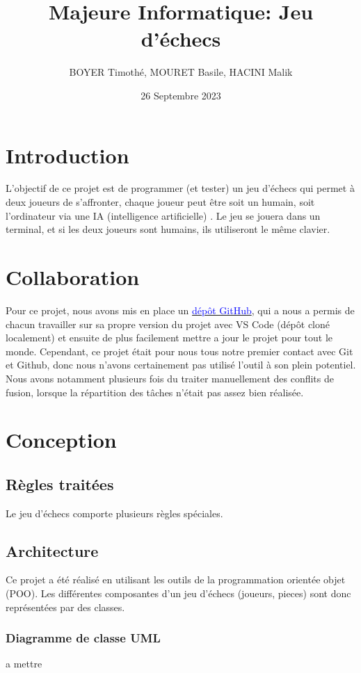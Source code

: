 \documentclass{article}
\title{\centering Majeure Informatique: 
Jeu d'échecs}
\author{BOYER Timothé, MOURET Basile, HACINI Malik}
\date{26 Septembre 2023}
\begin{document}
    
    

\maketitle
\tableofcontents{}

\section{Introduction}
L’objectif de ce projet est de programmer (et tester) un jeu
d’échecs qui permet à deux joueurs de s’affronter, 
chaque joueur peut être soit un humain, soit l’ordinateur via une IA
 (intelligence artificielle) . Le jeu se jouera dans un terminal, 
 et si les deux joueurs sont humains, ils utiliseront le même clavier.
 \section{Collaboration}
 
Pour ce projet, nous avons mis en place un \href{https://github.com/Zertag/Projet-POO}{\textcolor{blue}{dépôt GitHub}}, qui a nous a permis
de chacun travailler sur sa propre version du projet avec VS Code (dépôt cloné localement) et 
ensuite de plus facilement mettre a jour le projet pour tout le monde.
Cependant, ce projet était pour nous tous notre premier contact avec Git et Github, donc
nous n'avons certainement pas utilisé l'outil à son plein potentiel. Nous avons notamment
plusieurs fois du traiter manuellement des conflits de fusion, lorsque la répartition
des tâches n'était pas assez bien réalisée.
\section{Conception}
\subsection{Règles traitées}
Le jeu d'échecs comporte plusieurs règles spéciales.
\subsection{Architecture}
Ce projet a été réalisé en utilisant les outils de la programmation orientée objet (POO).
Les différentes composantes d'un jeu d'échecs (joueurs, pieces) sont donc 
représentées par des classes.
\subsubsection{Diagramme de classe UML}
a mettre
\end{document}

